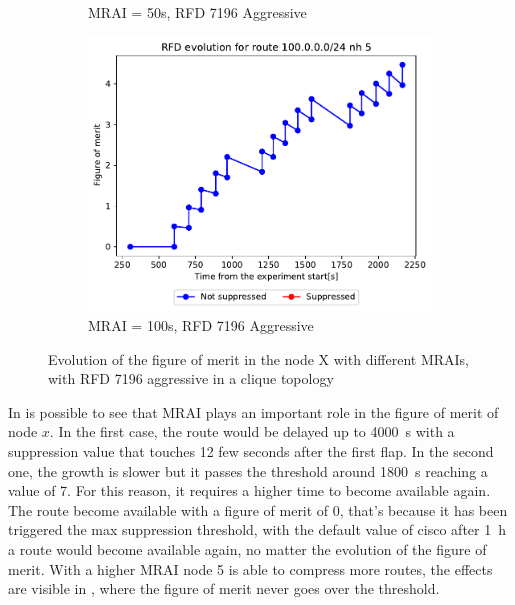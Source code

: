 \begin{figure}[h]
\begin{subfigure}[b]{0.49\textwidth}
         \caption{MRAI = 50s, RFD 7196 Aggressive}
         \label{fig:clique_x_mrai50_rfd7196Aggressive}
     \end{subfigure}
     \begin{subfigure}[b]{0.49\textwidth}
         \centering
         \includegraphics[width=\textwidth]{images/RFD/clique/FigureOfMerit/mrai21_RFD_7196_aggressive_x_rfd_R1.pdf}
         \caption{MRAI = 100s, RFD 7196 Aggressive}
         \label{fig:clique_x_mrai100_rfd7196Aggressive}
     \end{subfigure}
        \caption{Evolution of the figure of merit in the node X with different
				MRAIs, with RFD 7196 aggressive in a clique topology}
        \label{fig:clique_nodex_rfd7196Aggressive}
\end{figure}

In 
is possible to see
that \ac{MRAI} plays an important role in the figure of merit of node $x$.
In the first case, the route would be delayed up to \SI{4000}{\second} with a
suppression value that touches \num{12} few seconds after the first flap.
In the second one, the growth is slower but it passes the threshold around
\SI{1800}{\second} reaching a value of \num{7}.
For this reason, it requires a higher time to become available again.
The route become available with a figure of merit of \num{0}, that's because it
has been triggered the max suppression threshold,
with the default value of cisco after \SI{1}{\hour} a route would become available
again, no matter the evolution of the figure of merit.
With a higher \ac{MRAI} node \num{5} is able to compress more routes, the effects
are visible in , where the figure of
merit never goes over the threshold.

